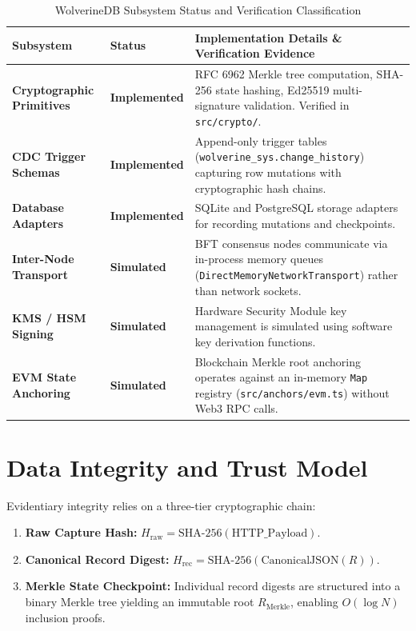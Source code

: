 \begin{table}[htbp]
\centering
\small
\caption{WolverineDB Subsystem Status and Verification Classification}
\label{tab:wdb-status}
\begin{tabular}{@{}p{3.8cm}p{3.2cm}p{6.8cm}@{}}
\toprule
\textbf{Subsystem} & \textbf{Status} & \textbf{Implementation Details \& Verification Evidence} \\ \midrule
\textbf{Cryptographic Primitives} & \textbf{Implemented} & RFC 6962 Merkle tree computation, SHA-256 state hashing, Ed25519 multi-signature validation. Verified in \texttt{src/crypto/}. \\ \addlinespace
\textbf{CDC Trigger Schemas} & \textbf{Implemented} & Append-only trigger tables (\texttt{wolverine\_sys.change\_history}) capturing row mutations with cryptographic hash chains. \\ \addlinespace
\textbf{Database Adapters} & \textbf{Implemented} & SQLite and PostgreSQL storage adapters for recording mutations and checkpoints. \\ \addlinespace
\textbf{Inter-Node Transport} & \textbf{Simulated} & BFT consensus nodes communicate via in-process memory queues (\texttt{DirectMemoryNetworkTransport}) rather than network sockets. \\ \addlinespace
\textbf{KMS / HSM Signing} & \textbf{Simulated} & Hardware Security Module key management is simulated using software key derivation functions. \\ \addlinespace
\textbf{EVM State Anchoring} & \textbf{Simulated} & Blockchain Merkle root anchoring operates against an in-memory \texttt{Map} registry (\texttt{src/anchors/evm.ts}) without Web3 RPC calls. \\ \bottomrule
\end{tabular}
\end{table}

\section{Data Integrity and Trust Model}
\label{sec:data-integrity}
Evidentiary integrity relies on a three-tier cryptographic chain:
\begin{enumerate}
    \item \textbf{Raw Capture Hash:} $H_{\text{raw}} = \text{SHA-256}(\text{HTTP\_Payload})$.
    \item \textbf{Canonical Record Digest:} $H_{\text{rec}} = \text{SHA-256}(\text{CanonicalJSON}(R))$.
    \item \textbf{Merkle State Checkpoint:} Individual record digests are structured into a binary Merkle tree yielding an immutable root $R_{\text{Merkle}}$, enabling $O(\log N)$ inclusion proofs.
\end{enumerate}

